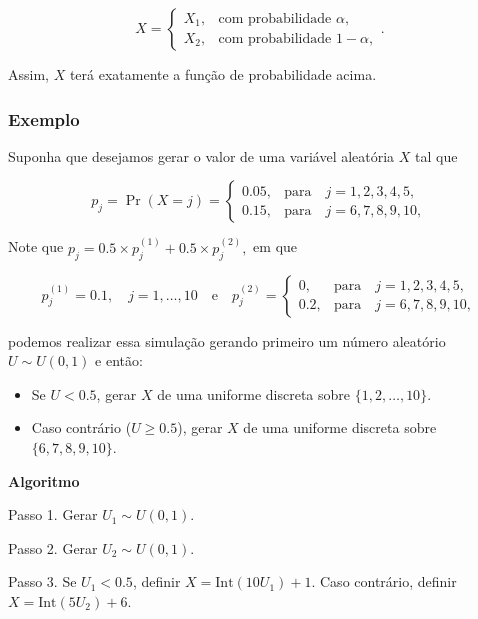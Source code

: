 \documentclass[
  letterpaper,
  DIV=11,
  numbers=noendperiod]{scrreprt}
\providecommand{\tightlist}{%
  \setlength{\itemsep}{0pt}\setlength{\parskip}{0pt}}\usepackage{longtable,booktabs,array}
\begin{document}
\[X =
\begin{cases}
X_1, & \text{com probabilidade } \alpha, \\
X_2, & \text{com probabilidade } 1-\alpha ,
\end{cases}.\]

Assim, \(X\) terá exatamente a função de probabilidade acima.

\subsubsection*{Exemplo}\label{exemplo-5}

Suponha que desejamos gerar o valor de uma variável aleatória \(X\) tal
que

\[p_j = \Pr(X = j) =  \begin{cases}
0.05, & \text{para}\quad j = 1, 2, 3, 4, 5, \\
0.15, & \text{para}\quad  j = 6, 7, 8, 9, 10,
\end{cases}\]

Note que \(p_j = 0.5 \times p_j^{(1)} + 0.5 \times p_j^{(2)},\) em que

\[p_j^{(1)} = 0.1, \quad j = 1, \dots, 10 \quad \text{e} \quad p_j^{(2)} = \begin{cases}
0, & \text{para}\quad j = 1, 2, 3, 4, 5, \\
0.2, & \text{para}\quad  j = 6, 7, 8, 9, 10,
\end{cases}\]

podemos realizar essa simulação gerando primeiro um número aleatório
\(U \sim U(0,1)\) e então:

\begin{itemize}
\tightlist
\item
  Se \(U < 0.5\), gerar \(X\) de uma uniforme discreta sobre
  \(\{1,2,\dots,10\}\).
\item
  Caso contrário (\(U \geq 0.5\)), gerar \(X\) de uma uniforme discreta
  sobre \(\{6,7,8,9,10\}\).
\end{itemize}

\begin{tcolorbox}[enhanced jigsaw, left=2mm, rightrule=.15mm, toprule=.15mm, opacityback=0, leftrule=.75mm, colframe=quarto-callout-warning-color-frame, colback=white, breakable, arc=.35mm, bottomrule=.15mm]

\vspace{-3mm}\textbf{Algoritmo}\vspace{3mm}

Passo 1. Gerar \(U_1 \sim U(0,1)\).

Passo 2. Gerar \(U_2 \sim U(0,1)\).

Passo 3. Se \(U_1 < 0.5\), definir \(X = \mathrm{Int}(10U_1)+1\). Caso
contrário, definir \(X = \mathrm{Int}(5U_2)+6\).

\end{tcolorbox}
\end{document}
